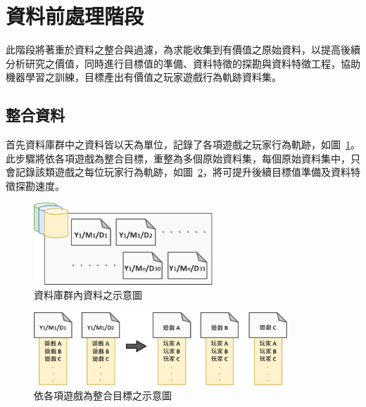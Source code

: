 \section{資料前處理階段}
\label{sec:DataPreProcess}

此階段將著重於資料之整合與過濾，為求能收集到有價值之原始資料，以提高後續分析研究之價值，同時進行目標值的準備、資料特徵的探勘與資料特徵工程，協助機器學習之訓練，目標產出有價值之玩家遊戲行為軌跡資料集。

\subsection{整合資料}
\label{subsec:DataIntegration}

首先資料庫群中之資料皆以天為單位，記錄了各項遊戲之玩家行為軌跡，如圖~\ref{fig:Image_Databases}。此步驟將依各項遊戲為整合目標，重整為多個原始資料集，每個原始資料集中，只會記錄該類遊戲之每位玩家行為軌跡，如圖~\ref{fig:Image_Integration}，將可提升後續目標值準備及資料特徵探勘速度。

\begin{figure}[!htb]
  \begin{center}
    \includegraphics[width=0.6\textwidth]{figures/Image_Databases.png}
    \caption[資料庫群內資料之示意圖]{資料庫群內資料之示意圖}
    \label{fig:Image_Databases}
  \end{center}
\end{figure}

\begin{figure}[!htb]
  \begin{center}
    \includegraphics[width=0.85\textwidth]{figures/Image_Integration.png}
    \caption[依各項遊戲為整合目標之示意圖]{依各項遊戲為整合目標之示意圖}
    \label{fig:Image_Integration}
  \end{center}
\end{figure}

